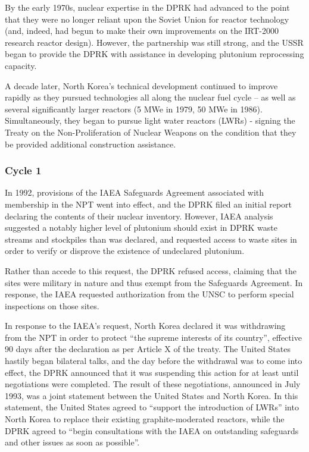 \documentclass{article}
\begin{document}
By the early 1970s, nuclear expertise in the DPRK had advanced to the point that they were no longer reliant upon the Soviet Union for reactor technology (and, indeed, had begun to make their own improvements on the IRT-2000 research reactor design)\cite{nti15}. However, the partnership was still strong, and the USSR began to provide the DPRK with assistance in developing plutonium reprocessing capacity\cite{nti15}.

A decade later, North Korea’s technical development continued to improve rapidly as they pursued technologies all along the nuclear fuel cycle – as well as several significantly larger reactors (5 MWe in 1979\cite{ntiYongbyon}, 50 MWe in 1986\cite{ntiYongbyon2}). Simultaneously, they began to pursue light water reactors (LWRs) - signing the Treaty on the Non-Proliferation of Nuclear Weapons on the condition that they be provided additional construction assistance\cite{nti15}.   

\subsubsection{Cycle 1}


In 1992, provisions of the IAEA Safeguards Agreement associated with membership in the NPT went into effect, and the DPRK filed an initial report declaring the contents of their nuclear inventory\cite{iaea92}. However, IAEA analysis suggested a notably higher level of plutonium should exist in DPRK waste streams and stockpiles than was declared, and requested access to waste sites in order to verify or disprove the existence of undeclared plutonium\cite{iaea09}. 

Rather than accede to this request, the DPRK refused access, claiming that the sites were military in nature and thus exempt from the Safeguards Agreement\cite{nti15,iaea09}. In response, the IAEA requested authorization from the UNSC to perform special inspections on those sites\cite{nti15}.
 
In response to the IAEA’s request, North Korea declared it was withdrawing from the NPT in order to protect “the supreme interests of its country”, effective 90 days after the declaration as per Article X of the treaty\cite{npt}. The United States hastily began bilateral talks, and the day before the withdrawal was to come into effect, the DPRK announced that it was suspending this action for at least until negotiations were completed\cite{nti15}. The result of these negotiations, announced in July 1993, was a joint statement between the United States and North Korea. In this statement, the United States agreed to “support the introduction of LWRs” into North Korea to replace their existing graphite-moderated reactors, while the DPRK agreed to “begin consultations with the IAEA on outstanding safeguards and other issues as soon as possible”\cite{hayes}. 
\end{document}
